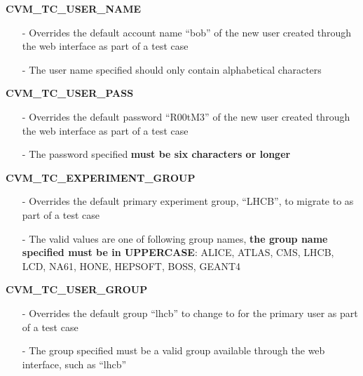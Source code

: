\begin{description}
\item {\bf CVM\_TC\_USER\_NAME}
		\begin{itemize}
		\item[-]	Overrides the default account name ``bob'' of the new user created 
				through the web interface as part of a \cernvmreleasetesting test case
		\item[-]	The user name specified should only contain alphabetical characters
		\end{itemize}
		
\item {\bf CVM\_TC\_USER\_PASS}
		\begin{itemize}
		\item[-]	Overrides the default password ``R00tM3'' of the new user created 
				through the web interface as part of a \cernvmreleasetesting test case
		\item[-]	The password specified {\bf must be six characters or longer}
		\end{itemize}
		
\item {\bf CVM\_TC\_EXPERIMENT\_GROUP}
		\begin{itemize}
		\item[-]	Overrides the default primary experiment group, ``LHCB'', to migrate to 
						as part of a \cernvmreleasetesting test case
		\item[-]	The valid values are one of following group names, {\bf the group name
				specified must be in UPPERCASE}: ALICE, ATLAS, CMS, LHCB, LCD, NA61, HONE,
				HEPSOFT, BOSS, GEANT4
		\end{itemize}
		
\item {\bf CVM\_TC\_USER\_GROUP}
		\begin{itemize}
		\item[-]	Overrides the default group ``lhcb'' to change to for the primary 
						user as part of a \cernvmreleasetesting test case
		\item[-]	The group specified must be a valid group available
				through the web interface, such as ``lhcb''
		\end{itemize}
\end{description}